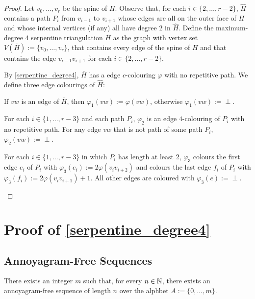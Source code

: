 \documentclass[kpfonts]{patmorin}
\begin{document}
\begin{proof}
    Let $v_0,\ldots,v_r$ be the spine of $H$. Observe that, for each $i\in\{2,\ldots,r-2\}$, $\hat{H}$ contains a path $P_i$ from $v_{i-1}$ to $v_{i+1}$ whose edges are all on the outer face of $H$ and whose internal vertices (if any) all have degree $2$ in $\hat{H}$.   Define the maximum-degree $4$ serpentine triangulation $\overline{H}$ as the graph with vertex set $V(\overline{H}):=\{v_0,\ldots,v_r\}$, that contains every edge of the spine of $H$ and that contains the edge $v_{i-1}v_{i+1}$ for each $i\in\{2,\ldots,r-2\}$.

    By \cref{serpentine_degree4}, $\overline{H}$ has a edge $c$-colouring $\varphi$ with no repetitive path.  We define three edge colourings of $\hat{H}$:
    \begin{compactenum}[$\varphi_1$:]
        \item If $vw$ is an edge of $\overline{H}$, then $\varphi_1(vw):=\varphi(vw)$, otherwise $\varphi_1(vw):=\perp$.
        \item For each $i\in\{1,\ldots,r-3\}$ and each path $P_i$, $\varphi_2$ is an edge $4$-colouring of $P_i$ with no repetitive path.  For any edge $vw$ that is not path of some path $P_i$, $\varphi_2(vw):=\perp$.
        \item For each $i\in\{1,\ldots,r-3\}$ in which $P_i$ has length at least $2$, $\varphi_3$ colours the first edge $e_i$ of $P_i$ with $\varphi_3(e_i):=2\varphi(v_iv_{i+2})$ and colours the last edge $f_i$ of $P_i$ with $\varphi_3(f_i):=2\varphi(v_iv_{i+1})+1$.  All other edges are coloured with $\varphi_3(e):=\perp$.
    \end{compactenum}
\end{proof}


\section{Proof of \cref{serpentine_degree4}}

\subsection{Annoyagram-Free Sequences}

\begin{lem}
    There exists an integer $m$ such that, for every $n\in\mathbb{N}$, there exists an annoyagram-free sequence of length $n$ over the alphbet $A:=\{0,\ldots,m\}$.
\end{lem}
\end{document}
